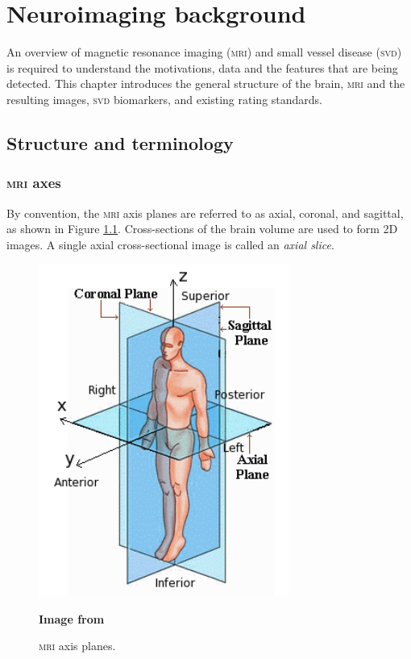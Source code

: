 %
%



\chapter{Neuroimaging background}\label{mri_svd_intro}

An overview of magnetic resonance imaging (\textsc{mri}) and small vessel disease (\textsc{svd}) is required to understand the motivations, data and the features that are being detected. This chapter introduces the general structure of the brain, \textsc{mri} and the resulting images, \textsc{svd} biomarkers, and existing rating standards.

\section{Structure and terminology}

\subsection*{\textsc{mri} axes}

By convention, the \textsc{mri} axis planes are referred to as axial, coronal, and sagittal, as shown in Figure \ref{svd-axes}. Cross-sections of the brain volume are used to form 2D images. A single axial cross-sectional image is called an \textit{axial slice}.

\begin{figure}[ht]
	\centering
	\includegraphics[scale=0.8]{Images/2_axes.png}
	\caption{\textsc{mri} axis planes.}
	\small \textbf{Image from}
	\label{svd-axes}
\end{figure}

